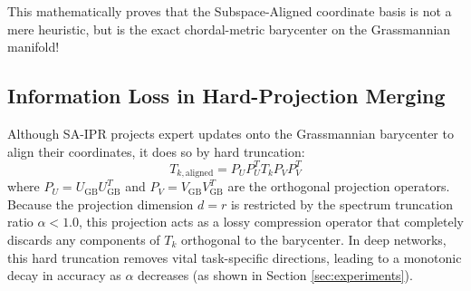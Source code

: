 \documentclass{article}
\theoremstyle{plain}
\theoremstyle{definition}
\theoremstyle{remark}
\begin{document}
This mathematically proves that the Subspace-Aligned coordinate basis is not a mere heuristic, but is the exact chordal-metric barycenter on the Grassmannian manifold!

\subsection{Information Loss in Hard-Projection Merging}
Although SA-IPR projects expert updates onto the Grassmannian barycenter to align their coordinates, it does so by hard truncation:
\begin{equation}
    T_{k, \text{aligned}} = P_U P_U^T T_k P_V P_V^T
\end{equation}
where $P_U = U_{\text{GB}} U_{\text{GB}}^T$ and $P_V = V_{\text{GB}} V_{\text{GB}}^T$ are the orthogonal projection operators.
Because the projection dimension $d = r$ is restricted by the spectrum truncation ratio $\alpha < 1.0$, this projection acts as a lossy compression operator that completely discards any components of $T_k$ orthogonal to the barycenter. In deep networks, this hard truncation removes vital task-specific directions, leading to a monotonic decay in accuracy as $\alpha$ decreases (as shown in Section \ref{sec:experiments}).
\end{document}
